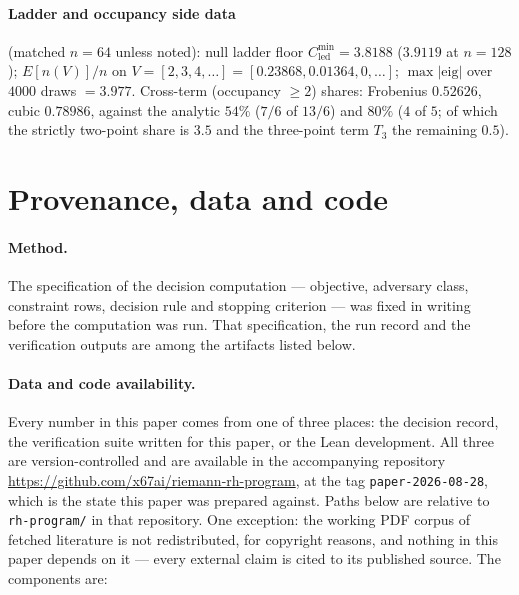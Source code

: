 \documentclass[11pt]{article}
\theoremstyle{plain}
\theoremstyle{definition}
\theoremstyle{remark}
\newcommand{\Cled}{C_{\mathrm{led}}}
\begin{document}
\paragraph{Ladder and occupancy side data}
(matched $n = 64$ unless noted): null ladder floor
$\Cled^{\min} = 3.8188$ ($3.9119$ at $n = 128$);
$E[n(V)]/n$ on $V = [2, 3, 4, \ldots] = [0.23868, 0.01364, 0, \ldots]$;
$\max |\mathrm{eig}|$ over $4000$ draws $= 3.977$. Cross-term (occupancy $\ge 2$)
shares: Frobenius $0.52626$, cubic $0.78986$, against the analytic $54\%$ ($7/6$
of $13/6$) and $80\%$ ($4$ of $5$; of which the strictly two-point share is $3.5$
and the three-point term $T_3$ the remaining $0.5$).

\section*{Provenance, data and code}

\paragraph{Method.}
The specification of the decision computation --- objective, adversary class,
constraint rows, decision rule and stopping criterion --- was fixed in writing
before the computation was run. That specification, the run record and the
verification outputs are among the artifacts listed below.

\paragraph{Data and code availability.}
Every number in this paper comes from one of three places: the decision record,
the verification suite written for this paper, or the Lean development. All
three are version-controlled and are available in the accompanying
repository \url{https://github.com/x67ai/riemann-rh-program}, at the tag
\texttt{paper-2026-08-28}, which is the state this paper was prepared against.
Paths below are relative to \texttt{rh-program/} in that repository. One
exception: the working PDF corpus of fetched literature is not redistributed,
for copyright reasons, and nothing in this paper depends on it --- every
external claim is cited to its published source. The components are:
\end{document}
